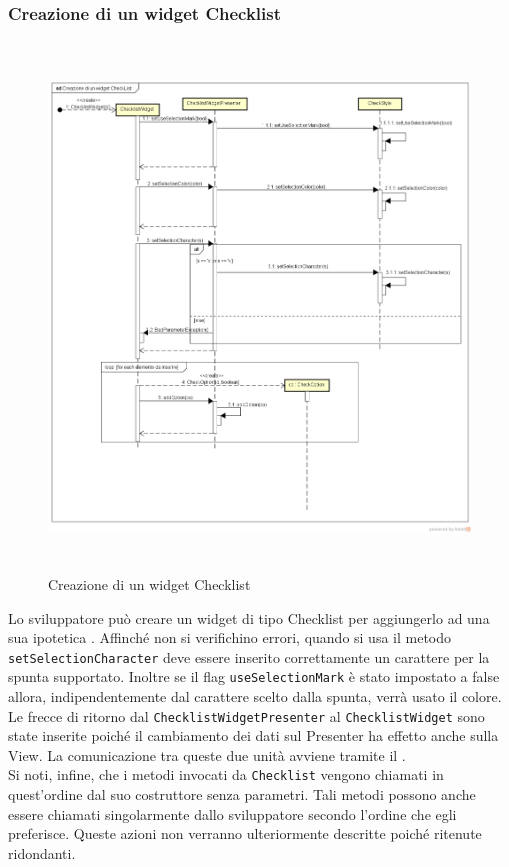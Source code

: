 \newpage

\subsubsection{Creazione di un widget Checklist}

\label{Creazione di un widget Checklist}
\begin{figure}[ht]
	\centering
	\includegraphics[width=16cm, height=14cm]{Sezioni/Diagrammi/img/Creazione di un widget CheckList.png}
	\caption{Creazione di un widget Checklist}
\end{figure}

Lo sviluppatore può creare un widget di tipo Checklist per aggiungerlo ad una sua ipotetica . Affinché non si verifichino errori, quando si usa il metodo \texttt{setSelectionCharacter} deve essere inserito correttamente un carattere per la spunta supportato. Inoltre se il flag \texttt{useSelectionMark} è stato impostato a false allora, indipendentemente dal carattere scelto dalla spunta, verrà usato il colore.\\
Le frecce di ritorno dal \texttt{ChecklistWidgetPresenter}  al \texttt{ChecklistWidget} sono state inserite poiché il cambiamento dei dati sul Presenter ha effetto anche sulla View. La comunicazione tra queste due unità avviene tramite il  . \\
Si noti, infine, che i metodi invocati da \texttt{Checklist} vengono chiamati in quest'ordine dal suo costruttore senza parametri. Tali metodi possono anche essere chiamati singolarmente dallo sviluppatore secondo l'ordine che egli preferisce. Queste azioni non verranno ulteriormente descritte poiché ritenute ridondanti.

